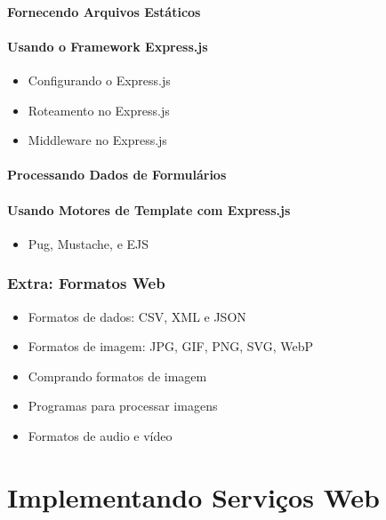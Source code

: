 \subsubsection{Fornecendo Arquivos Estáticos}
\subsubsection{Usando o Framework Express.js}
\begin{itemize}
\item Configurando o Express.js
\item Roteamento no Express.js
\item Middleware no Express.js
\end{itemize}
\subsubsection{Processando Dados de Formulários}
\subsubsection{Usando Motores de Template com Express.js}
\begin{itemize}
\item Pug, Mustache, e EJS
\end{itemize}
\subsection{Extra: Formatos Web}
\begin{itemize}
    \item Formatos de dados: CSV, XML e JSON
    \item Formatos de imagem: JPG, GIF, PNG, SVG, WebP
    \item Comprando formatos de imagem
    \item Programas para processar imagens
    \item Formatos de audio e vídeo 
\end{itemize}














\chapter{Implementando Serviços Web}
